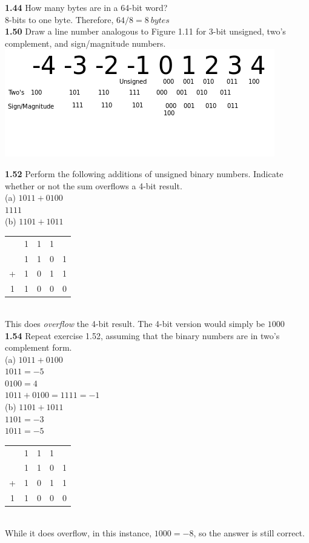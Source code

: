 \documentclass[12pt,a4paper]{report}
\begin{document}
\begin{normalsize}
\textbf{1.44} How many bytes are in a 64-bit word? \\
8-bits to one byte. Therefore, $ 64/8 = 8\: bytes $ \\

\textbf{1.50} Draw a line number analogous to Figure 1.11 for 3-bit unsigned, two's complement, and sign/magnitude numbers. \\
\includegraphics[scale=0.8]{Number_line.png} 

\textbf{1.52} Perform the following additions of unsigned binary numbers. Indicate whether or not the sum overflows a 4-bit result. \\
(a) $ 1011 + 0100 $ \\
$ 1111 $ \\

(b) $ 1101 + 1011 $ \\
\begin{tabular}{c@{\,}c@{\,}c@{\,}c@{\,}c}
  & 1 & 1 & 1 & \\
  & 1 & 1 & 0 & 1 \\
+ & 1 & 0 & 1 & 1 \\
\hline
1 & 1 & 0 & 0 & 0 \\
\end{tabular} \\
This does \emph{overflow} the 4-bit result. The 4-bit version would simply be $ 1000 $ \\

\textbf{1.54} Repeat exercise 1.52, assuming that the binary numbers are in two's complement form. \\
(a) $ 1011 + 0100 $ \\
$ 1011 = -5 $ \\
$ 0100 = 4 $ \\
$ 1011 + 0100 = 1111 = -1 $ \\

(b) $ 1101 + 1011 $ \\
$ 1101 = -3 $ \\
$ 1011 = -5 $ \\
\begin{tabular}{c@{\,}c@{\,}c@{\,}c@{\,}c}
  & 1 & 1 & 1 & \\
  & 1 & 1 & 0 & 1 \\
+ & 1 & 0 & 1 & 1 \\
\hline
1 & 1 & 0 & 0 & 0 \\
\end{tabular} \\
While it does overflow, in this instance, $ 1000 = -8 $, so the answer is still correct. \\


\end{normalsize}
\end{document}
